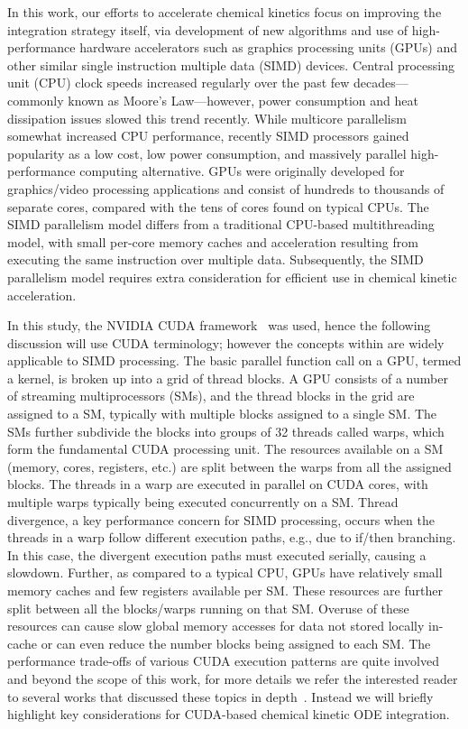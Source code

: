 \documentclass[final,twocolumn]{elsarticle}
\begin{document}
In this work, our efforts to accelerate chemical kinetics focus on improving the integration strategy itself, via development of new algorithms and use of high-performance hardware accelerators such as graphics processing units (GPUs) and other similar single instruction multiple data (SIMD) devices.
Central processing unit (CPU) clock speeds increased regularly over the past few decades---commonly known as Moore's Law---however, power consumption and heat dissipation issues slowed this trend recently.
While multicore parallelism somewhat increased CPU performance, recently SIMD processors gained popularity as a low cost, low power consumption, and massively parallel high-performance computing alternative.
GPUs were originally developed for graphics\slash video processing applications and consist of hundreds to thousands of separate cores, compared with the tens of cores found on typical CPUs.
The SIMD parallelism model differs from a traditional CPU-based multithreading model, with small per-core memory caches and acceleration resulting from executing the same instruction over multiple data.
Subsequently, the SIMD parallelism model requires extra consideration for efficient use in chemical kinetic acceleration.

In this study, the NVIDIA CUDA framework~\cite{Buck:2008aa,NVIDIA:2015aa} was used, hence the following discussion will use CUDA terminology; however the concepts within are widely applicable to SIMD processing.
The basic parallel function call on a GPU, termed a kernel, is broken up into a grid of thread blocks.
A GPU consists of a number of streaming multiprocessors (SMs), and the thread blocks in the grid are assigned to a SM, typically with multiple blocks assigned to a single SM.
The SMs further subdivide the blocks into groups of \num{32} threads called warps, which form the fundamental CUDA processing unit.
The resources available on a SM (memory, cores, registers, etc.) are split between the warps from all the assigned blocks.
The threads in a warp are executed in parallel on CUDA cores, with multiple warps typically being executed concurrently on a SM.
Thread divergence, a key performance concern for SIMD processing, occurs when the threads in a warp follow different execution paths, e.g., due to if\slash then branching.
In this case, the divergent execution paths must executed serially, causing a slowdown.
Further, as compared to a typical CPU, GPUs have relatively small memory caches and few registers available per SM.
These resources are further split between all the blocks\slash warps running on that SM.
Overuse of these resources can cause slow global memory accesses for data not stored locally in-cache or can even reduce the number blocks being assigned to each SM.
The performance trade-offs of various CUDA execution patterns are quite involved and beyond the scope of this work, for more details we refer the interested reader to several works that discussed these topics in depth~\cite{Cruz:2011gc,Brodtkorb:2013hn,Niemeyer:2014hn}.
Instead we will briefly highlight key considerations for CUDA-based chemical kinetic ODE integration.
\end{document}
